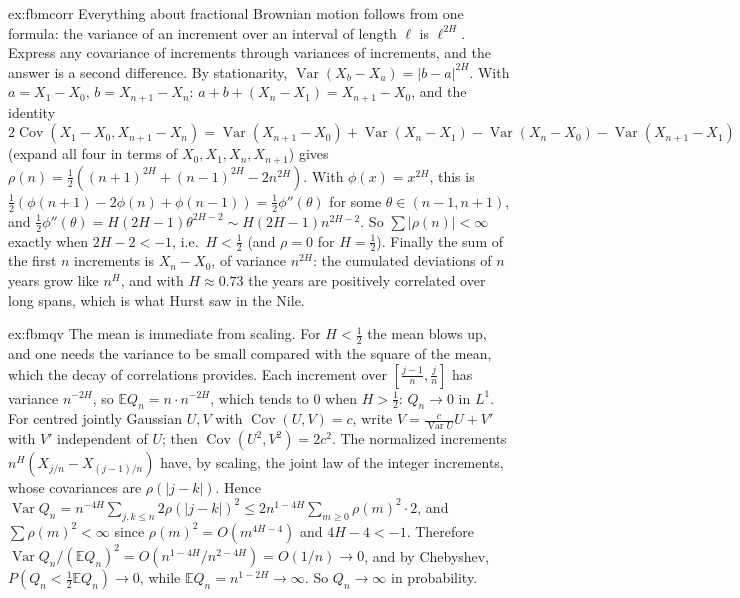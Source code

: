 \begin{solution}{ex:fbmcorr}
\idea Everything about fractional Brownian motion follows from one formula: the variance of an increment over an interval of length $\ell$ is $\ell^{2H}$. Express any covariance of increments through variances of
increments, and the answer is a second difference.
\writeup By stationarity, $\operatorname{Var}(X_b-X_a)=|b-a|^{2H}$. With $a=X_1-X_0$, $b=X_{n+1}-X_n$: $a+b+(X_n-X_1)=X_{n+1}-X_0$, and the identity
$2\operatorname{Cov}(X_1-X_0,X_{n+1}-X_n)=\operatorname{Var}(X_{n+1}-X_0)+\operatorname{Var}(X_n-X_1)-\operatorname{Var}(X_{n}-X_0)-\operatorname{Var}(X_{n+1}-X_1)$ (expand all four in terms of $X_0,X_1,X_n,X_{n+1}$)
gives $\rho(n)=\frac12((n+1)^{2H}+(n-1)^{2H}-2n^{2H})$. With $\phi(x)=x^{2H}$, this is $\frac12(\phi(n+1)-2\phi(n)+\phi(n-1))=\frac12\phi''(\theta)$ for some $\theta\in(n-1,n+1)$, and
$\frac12\phi''(\theta)=H(2H-1)\theta^{2H-2}\sim H(2H-1)n^{2H-2}$. So $\sum|\rho(n)|<\infty$ exactly when $2H-2<-1$, i.e.\ $H<\frac12$ (and $\rho=0$ for $H=\frac12$). Finally the sum of the first $n$ increments is $X_n-X_0$,
of variance $n^{2H}$: the cumulated deviations of $n$ years grow like $n^H$, and with $H\approx0.73$ the years are positively correlated over long spans, which is what Hurst saw in the Nile.
\end{solution}

\begin{solution}{ex:fbmqv}
\idea The mean is immediate from scaling. For $H<\frac12$ the mean blows up, and one needs the variance to be small compared with the square of the mean, which the decay of correlations provides.
\writeup Each increment over $[\frac{j-1}n,\frac jn]$ has variance $n^{-2H}$, so $\mathbb E Q_n=n\cdot n^{-2H}$, which tends to $0$ when $H>\frac12$: $Q_n\to0$ in $L^1$. For centred jointly Gaussian $U,V$ with
$\operatorname{Cov}(U,V)=c$, write $V=\frac c{\operatorname{Var}U}U+V'$ with $V'$ independent of $U$; then $\operatorname{Cov}(U^2,V^2)=2c^2$. The normalized increments $n^H(X_{j/n}-X_{(j-1)/n})$ have, by scaling, the joint
law of the integer increments, whose covariances are $\rho(|j-k|)$. Hence $\operatorname{Var}Q_n=n^{-4H}\sum_{j,k\le n}2\rho(|j-k|)^2\le2n^{1-4H}\sum_{m\ge0}\rho(m)^2\cdot2$, and $\sum\rho(m)^2<\infty$ since
$\rho(m)^2=O(m^{4H-4})$ and $4H-4<-1$. Therefore $\operatorname{Var}Q_n/(\mathbb E Q_n)^2=O(n^{1-4H}/n^{2-4H})=O(1/n)\to0$, and by Chebyshev, $P(Q_n<\frac12\mathbb E Q_n)\to0$, while $\mathbb E Q_n=n^{1-2H}\to\infty$. So
$Q_n\to\infty$ in probability.
\end{solution}

